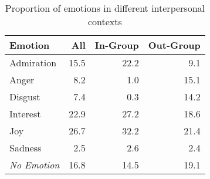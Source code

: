 \begin{table}[t]
	\centering
	\begin{tabular}{lrrr}
		\toprule
		\textbf{Emotion} & \textbf{All} & \textbf{In-Group} & \textbf{Out-Group} \\ \midrule
		Admiration & 15.5 & 22.2 & 9.1\\ %
        Anger & 8.2 & 1.0 & 15.1\\ %
        Disgust & 7.4 & 0.3 & 14.2\\ %
        Interest & 22.9 & 27.2 & 18.6\\ %
        Joy & 26.7 & 32.2 & 21.4\\ %
        Sadness & 2.5 & 2.6 & 2.4\\ %
        \emph{No Emotion} & 16.8 & 14.5 & 19.1 \\
        \bottomrule
	\end{tabular}
	\caption{Proportion of emotions in different interpersonal contexts}
	\label{tab:inoutdist}
\end{table}
